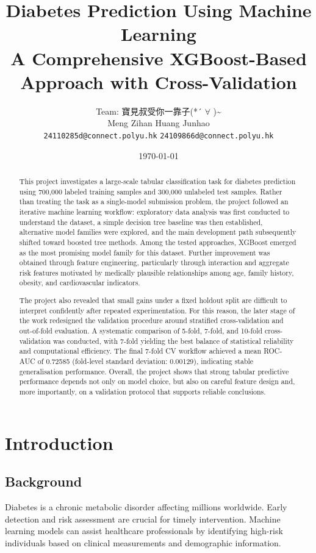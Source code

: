 \documentclass[a4paper,11pt]{article}
\title{Diabetes Prediction Using Machine Learning \\
\large A Comprehensive XGBoost-Based Approach with Cross-Validation}
\author{
  {Team: 寶見叔受你一靠子(*´ $\forall$ \textasciigrave{})\textasciitilde{}\ding{170}} \\[4pt]
  Meng Zihan \quad Huang Junhao \\[2pt]
  \texttt{24110285d@connect.polyu.hk} \quad \texttt{24109866d@connect.polyu.hk}
}
\date{\today}
\begin{document}
\maketitle

\begin{abstract}
This project investigates a large-scale tabular classification task for diabetes prediction using 700,000 labeled training samples and 300,000 unlabeled test samples. Rather than treating the task as a single-model submission problem, the project followed an iterative machine learning workflow: exploratory data analysis was first conducted to understand the dataset, a simple decision tree baseline was then established, alternative model families were explored, and the main development path subsequently shifted toward boosted tree methods. Among the tested approaches, XGBoost emerged as the most promising model family for this dataset. Further improvement was obtained through feature engineering, particularly through interaction and aggregate risk features motivated by medically plausible relationships among age, family history, obesity, and cardiovascular indicators.

The project also revealed that small gains under a fixed holdout split are difficult to interpret confidently after repeated experimentation. For this reason, the later stage of the work redesigned the validation procedure around stratified cross-validation and out-of-fold evaluation. A systematic comparison of 5-fold, 7-fold, and 10-fold cross-validation was conducted, with 7-fold yielding the best balance of statistical reliability and computational efficiency. The final 7-fold CV workflow achieved a mean ROC-AUC of 0.72585 (fold-level standard deviation: 0.00129), indicating stable generalisation performance. Overall, the project shows that strong tabular predictive performance depends not only on model choice, but also on careful feature design and, more importantly, on a validation protocol that supports reliable conclusions.
\end{abstract}

\section{Introduction}

\subsection{Background}
Diabetes is a chronic metabolic disorder affecting millions worldwide. Early detection and risk assessment are crucial for timely intervention. Machine learning models can assist healthcare professionals by identifying high-risk individuals based on clinical measurements and demographic information.
\end{document}
